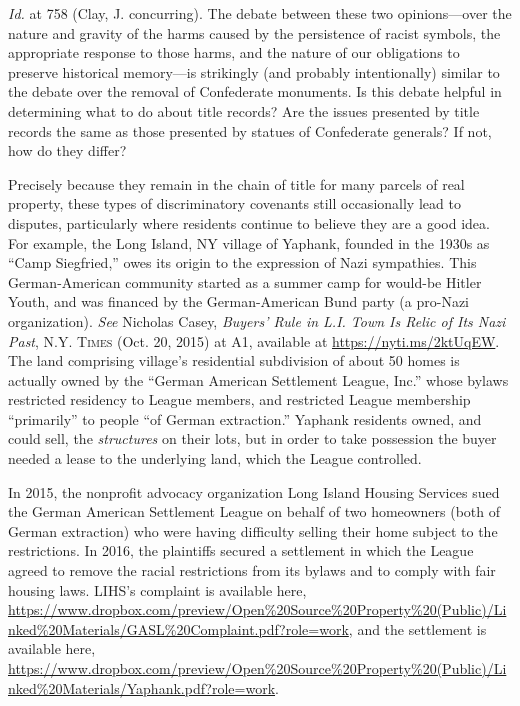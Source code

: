 \textit{Id.} at 758 (Clay, J. concurring). The debate between these two
opinions---over the nature and gravity of the harms caused by the persistence of
racist symbols, the appropriate response to those harms, and the nature of our
obligations to preserve historical memory---is strikingly (and probably
intentionally) similar to the debate over the removal of Confederate monuments.
Is this debate helpful in determining what to do about title records? Are the
issues presented by title records the same as those presented by statues of
Confederate generals? If not, how do they differ?


\item Precisely because they remain in the chain of title for many parcels of
real property, these types of discriminatory covenants still occasionally lead
to disputes, particularly where residents continue to believe they are a good
idea. For example, the Long Island, NY village of Yaphank, founded in the 1930s
as ``Camp Siegfried,'' owes its origin to the expression of Nazi sympathies.
This German-American community started as a summer camp for would-be Hitler
Youth, and was financed by the German-American Bund party (a pro-Nazi
organization). \textit{See} Nicholas Casey, \textit{Buyers' Rule in L.I. Town Is
Relic of Its Nazi Past}, \textsc{N.Y. Times} (Oct. 20, 2015) at A1, available at
\url{https://nyti.ms/2ktUqEW}. The land comprising village's residential
subdivision of about 50 homes is actually owned by the ``German American
Settlement League, Inc.'' whose bylaws restricted residency to League members,
and restricted League membership ``primarily'' to people ``of German
extraction.'' Yaphank residents owned, and could sell, the \textit{structures}
on their lots, but in order to take possession the buyer needed a lease to the
underlying land, which the League controlled.

In 2015, the nonprofit advocacy organization Long Island Housing Services sued
the German American Settlement League on behalf of two homeowners (both of
German extraction) who were having difficulty selling their home subject to the
restrictions. In 2016, the plaintiffs secured a settlement in which the League
agreed to remove the racial restrictions from its bylaws and to comply with fair
housing laws. LIHS's complaint is available here,
\url{https://www.dropbox.com/preview/Open\%20Source\%20Property\%20(Public)/Linked\%20Materials/GASL\%20Complaint.pdf?role=work},
and the settlement is available here,
\url{https://www.dropbox.com/preview/Open\%20Source\%20Property\%20(Public)/Linked\%20Materials/Yaphank.pdf?role=work}.


